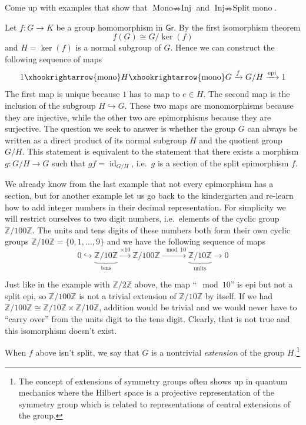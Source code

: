 \documentclass[english,letterpaper]{article}%
\numberwithin{equation}{section}
\numberwithin{figure}{section}
\numberwithin{table}{section}
\theoremstyle{definition}
\theoremstyle{definition}
\theoremstyle{definition}
\theoremstyle{plain}
\theoremstyle{plain}
\theoremstyle{plain}
\theoremstyle{plain}
\theoremstyle{remark}
\theoremstyle{remark}
\newcommand{\bbZ}{\mathbb{Z}}
\DeclareMathOperator{\id}{id}
\begin{document}
\begin{xca}
Come up with examples that show that $\text{Mono}\nRightarrow\text{Inj}$
and $\text{Inj}\nRightarrow\text{Split mono}$.
\end{xca}
\begin{example}
 Let $f:G\rightarrow K$ be a group homomorphism in $\mathsf{Gr}$.
By the first isomorphism theorem 
\begin{equation}
f(G)\cong G/\ker(f)
\end{equation}
and $H=\ker(f)$ is a normal subgroup of $G$. Hence we can construct
the following sequence of maps
\begin{equation}
1\xhookrightarrow{\text{mono}}H\xhookrightarrow{\text{mono}}G\xrightarrow{f}G/H\xrightarrow{\text{epi}}1
\end{equation}
The first map is unique because $1$ has to map to $e\in H$. The second map is the inclusion of the subgroup $H\hookrightarrow G$. These two maps are monomorphisms because they are injective, while
the other two are epimorphisms because they are surjective. The question
we seek to answer is whether the group $G$ can always be written as
a direct product of its normal subgroup $H$ and the quotient group $G/H$.
This statement is equivalent to the statement that there exists a morphism
$g:G/H\rightarrow G$ such that $gf=\id_{G/H}$, i.e.\ $g$ is a section
of the split epimorphism $f$. 

We already know from the last example that not every epimorphism has a section, but for another example let us go back to the kindergarten and
re-learn how to add integer numbers in their decimal representation. For simplicity we will restrict ourselves
to two digit numbers, i.e.\ elements of the cyclic group $\mathbb{Z}/100\mathbb{Z}$.
The units and tens digits of these numbers both form their own cyclic
groups $\mathbb{Z}/10\mathbb{Z}=\{0,1,\ldots,9\}$ and we have the following
sequence of maps 
\begin{equation}
0\hookrightarrow\underbrace{\mathbb{Z}/10\mathbb{Z}}_\text{tens}\xrightarrow{\times10}\mathbb{Z}/100\mathbb{Z}\xrightarrow{\mod 10}\underbrace{\mathbb{Z}/10\mathbb{Z}}_\text{units}\rightarrow0
\end{equation}

Just like in the example with $\mathbb{Z}/2\bbZ$ above, the map ``$\mod 10$'' is epi but not a split epi, so $\mathbb{Z}/100\mathbb{Z}$ is not a trivial extension of $\mathbb{Z}/10\mathbb{Z}$ by itself. If we had $\mathbb{Z}/100\mathbb{Z}\cong\mathbb{Z}/10\mathbb{Z}\times\mathbb{Z}/10\mathbb{Z}$,
addition would be trivial and we would never have to ``carry over''
from the units digit to the tens digit. Clearly, that is not true
and this isomorphism doesn't exist. 

When $f$ above isn't split, we say that $G$ is a nontrivial \emph{extension}
of the group $H$.\footnote{The concept of extensions of symmetry groups often shows up in quantum
mechanics where the Hilbert space is a projective representation of
the symmetry group which is related to representations of central
extensions of the group.}
\end{example}
\end{document}
